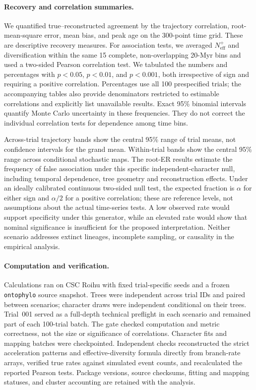 \paragraph{Recovery and correlation summaries.}
We quantified true--reconstructed agreement by the trajectory correlation,
root-mean-square error, mean bias, and peak age on the 300-point time grid.
These are descriptive recovery measures. For association tests, we averaged
$N_{\mathrm{eff}}^{+}$ and diversification within the same 15 complete,
non-overlapping 20-Myr bins and used a two-sided Pearson correlation test.
We tabulated the numbers and percentages with $p<0.05$, $p<0.01$, and
$p<0.001$, both irrespective of sign and requiring a positive correlation.
Percentages use all 100 prespecified trials; the accompanying tables also
provide denominators restricted to estimable correlations and explicitly
list unavailable results. Exact 95\% binomial intervals quantify Monte Carlo
uncertainty in these frequencies. They do not correct the individual
correlation tests for dependence among time bins.

Across-trial trajectory bands show the central 95\% range of trial means,
not confidence intervals for the grand mean. Within-trial bands show the
central 95\% range across conditional stochastic maps. The root-ER results estimate the frequency of false association under this
specific independent-character null, including temporal dependence, tree
geometry and reconstruction effects. Under an ideally calibrated continuous
two-sided null test, the expected fraction is $\alpha$ for either sign and
$\alpha/2$ for a positive correlation; these are reference levels, not
assumptions about the actual time-series tests. A low observed rate would
support specificity under this generator, while an elevated rate would
show that nominal significance is insufficient for the proposed
interpretation. Neither scenario addresses extinct lineages, incomplete
sampling, or causality in the empirical analysis.

\paragraph{Computation and verification.}
Calculations ran on CSC Roihu with fixed trial-specific seeds and a frozen
\texttt{ontophylo} source snapshot. Trees were independent across trial IDs and paired between scenarios;
character draws were independent conditional on their trees. Trial~001
served as a full-depth technical preflight in each scenario and remained
part of each 100-trial batch. The gate checked computation and metric correctness, not the size or
significance of correlations. Character fits and mapping batches were
checkpointed. Independent checks reconstructed the strict acceleration
patterns and effective-diversity formula directly from branch-rate arrays,
verified true rates against simulated event counts, and recalculated the
reported Pearson tests. Package versions, source checksums, fitting and
mapping statuses, and cluster accounting are retained with the analysis.
